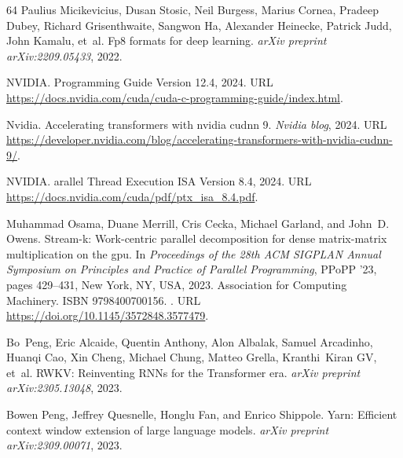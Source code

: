 \documentclass{article}
\begin{document}
\begin{thebibliography}{64}
Paulius Micikevicius, Dusan Stosic, Neil Burgess, Marius Cornea, Pradeep Dubey,
  Richard Grisenthwaite, Sangwon Ha, Alexander Heinecke, Patrick Judd, John
  Kamalu, et~al.
\newblock Fp8 formats for deep learning.
\newblock \emph{arXiv preprint arXiv:2209.05433}, 2022.

NVIDIA.
 {P}rogramming {G}uide {V}ersion 12.4, 2024.
\newblock URL
  \url{https://docs.nvidia.com/cuda/cuda-c-programming-guide/index.html}.

Nvidia.
\newblock Accelerating transformers with nvidia cudnn 9.
\newblock \emph{Nvidia blog}, 2024.
\newblock URL
  \url{https://developer.nvidia.com/blog/accelerating-transformers-with-nvidia-cudnn-9/}.

NVIDIA.
arallel {T}hread {E}xecution {ISA} {V}ersion 8.4, 2024.
\newblock URL \url{https://docs.nvidia.com/cuda/pdf/ptx_isa_8.4.pdf}.

Muhammad Osama, Duane Merrill, Cris Cecka, Michael Garland, and John~D. Owens.
\newblock Stream-k: Work-centric parallel decomposition for dense matrix-matrix
  multiplication on the gpu.
\newblock In \emph{Proceedings of the 28th ACM SIGPLAN Annual Symposium on
  Principles and Practice of Parallel Programming}, PPoPP '23, pages 429--431,
  New York, NY, USA, 2023. Association for Computing Machinery.
\newblock ISBN 9798400700156.
\newblock {}.
\newblock URL \url{https://doi.org/10.1145/3572848.3577479}.

Bo~Peng, Eric Alcaide, Quentin Anthony, Alon Albalak, Samuel Arcadinho, Huanqi
  Cao, Xin Cheng, Michael Chung, Matteo Grella, Kranthi~Kiran GV, et~al.
\newblock R{W}{K}{V}: Reinventing {R}{N}{N}s for the {T}ransformer era.
\newblock \emph{arXiv preprint arXiv:2305.13048}, 2023{}.

Bowen Peng, Jeffrey Quesnelle, Honglu Fan, and Enrico Shippole.
\newblock Yarn: Efficient context window extension of large language models.
\newblock \emph{arXiv preprint arXiv:2309.00071}, 2023{}.


\end{thebibliography}
\end{document}
